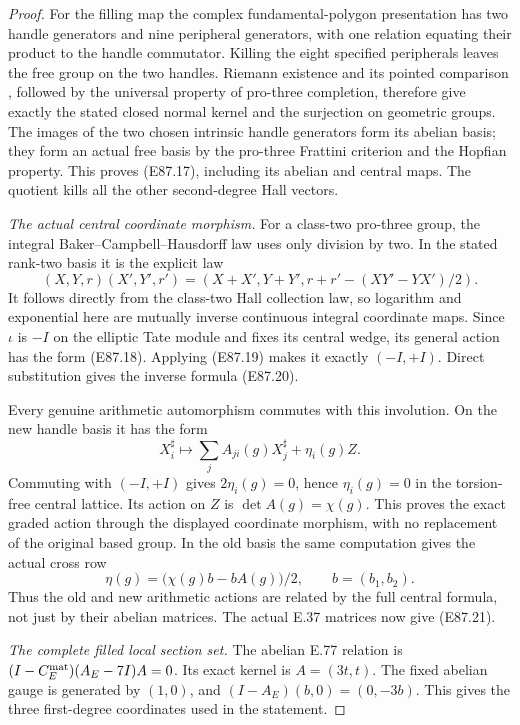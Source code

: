 \begin{proof}
For the filling map the complex
fundamental-polygon presentation has
two handle generators and nine
peripheral generators, with one
relation equating their product
to the handle commutator. Killing
the eight specified peripherals
leaves the free group on the two
handles. Riemann existence and
its pointed comparison
\cite[Expos\'e XII, Th\'eor\`eme~5.1 and Corollaire~5.2]{E_SGA1}, followed by the
universal property of pro-three
completion, therefore give exactly
the stated closed normal kernel
and the surjection on geometric
groups. The images of the two chosen
intrinsic handle generators form its
abelian basis; they form an actual free
basis by the pro-three Frattini criterion
and the Hopfian property. This proves
(E87.17), including its abelian and
central maps. The quotient kills all
the other second-degree Hall vectors.

\emph{The actual central coordinate morphism.}
For a class-two pro-three group, the
integral Baker--Campbell--Hausdorff law
uses only division by two. In the stated
rank-two basis it is the explicit law
\[
 (X,Y,r)(X',Y',r')
   =(X+X',Y+Y',r+r'-(XY'-YX')/2).
 \tag{E87.35}
\]
It follows directly from the class-two
Hall collection law, so logarithm and
exponential here are mutually inverse
continuous integral coordinate maps.
Since $\iota$ is $-I$ on the elliptic
Tate module and fixes its central wedge,
its general action has the form (E87.18).
Applying (E87.19) makes it exactly
$(-I,+I)$. Direct substitution gives
the inverse formula (E87.20).

Every genuine arithmetic automorphism
commutes with this involution. On the
new handle basis it has the form
\[
 X_i^\sharp\longmapsto
       \sum_j A_{ji}(g)X_j^\sharp+\eta_i(g)Z.
 \tag{E87.36}
\]
Commuting with $(-I,+I)$ gives
$2\eta_i(g)=0$, hence $\eta_i(g)=0$
in the torsion-free central lattice.
Its action on $Z$ is $\det A(g)=\chi(g)$.
This proves the exact graded action
through the displayed coordinate
morphism, with no replacement of the
original based group. In the old basis
the same computation gives the actual
cross row
\[
             \eta(g)=\bigl(\chi(g)b-bA(g)\bigr)/2,
                   \qquad b=(b_1,b_2).
 \tag{E87.37}
\]
Thus the old and new arithmetic actions
are related by the full central formula,
not just by their abelian matrices.
The actual E.37 matrices now give (E87.21).

\emph{The complete filled local section set.}
The abelian E.77 relation is
$(I-C_E^{\rm mat})(A_E-7I)A=0$.
Its exact kernel is $A=(3t,t)$.
The fixed abelian gauge is generated
by $(1,0)$, and $(I-A_E)(b,0)=(0,-3b)$.
This gives the three first-degree
coordinates used in the statement.


\end{proof}
